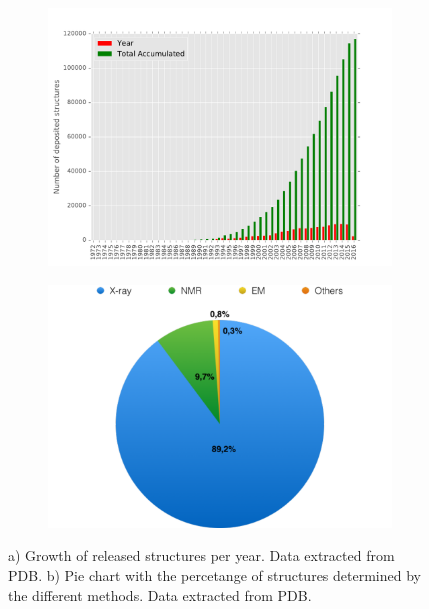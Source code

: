 \documentclass[11pt, b5paper,twoside]{tesi_upf}
\begin{document}
\begin{figure}[htbp]
  
  \centering
    \begin{subfigure}[b]{0.75\textwidth}
	\includegraphics[width=1\linewidth]{../figures/pdbs_per_year.pdf}
	\caption{}
	\label{fig:structures_pdb}
	\end{subfigure}
	\begin{subfigure}[b]{0.75\textwidth}
	\includegraphics[width=1\linewidth]{../figures/pie_smethods.pdf}
	\caption{}
	\label{fig:smethods_pie}
	\end{subfigure}
   \caption[Deposited structures in PDB per year]{a) Growth of released structures per year. Data extracted from PDB. b) Pie chart with the percetange of structures determined by the different methods. Data extracted from PDB.}
   
	
	
\end{figure}
 
\end{document}
